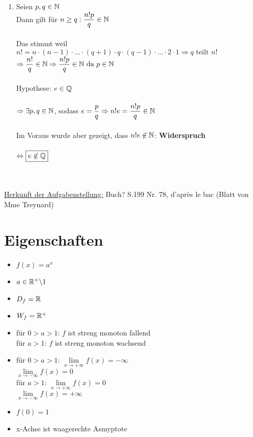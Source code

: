 \begin{Beweis}
\begin{enumerate}
\item Seien $p, q \in\mathbb{N}$\\
Dann gilt für $n\geq q:\dfrac{n!p}{q}\in\mathbb{N}$\\\\
Das stimmt weil $n!=n\cdot(n-1)\cdot...\cdot(q+1)\cdot q\cdot(q-1)\cdot...\cdot2\cdot1\Rightarrow q \text{ teilt }n!$
$\Rightarrow \dfrac{n!}{q}\in\mathbb{N}\Rightarrow\dfrac{n!p}{q}\in\mathbb{N}\text{ da }p\in\mathbb{N}$\\\\
Hypothese: $e\in\mathbb{Q}$\\\\
$\Rightarrow \exists p,q \in\mathbb{N}$, sodass $e=\dfrac{p}{q}\\
\Rightarrow n!e=\dfrac{n!p}{q}\in\mathbb{N}$\\\\
Im Voraus wurde aber gezeigt, dass $n!e\not\in\mathbb{N}$: \textbf{Widerspruch}\\\\
$\Leftrightarrow \boxed{e\not\in\mathbb{Q}}$ \heartsuit\\\\\\
\end{enumerate}
\underline{Herkunft der Aufgabenstellung:} Buch? S.199 Nr. 78, d'après le bac (Blatt von Mme Treynard)
\end{Beweis}

\section{Eigenschaften}
		

\begin{itemize}
\item$f(x)=a^x$
\item$a\in\mathbb{R}^+\backslash 1$
\item$D_f=\mathbb{R}$
\item$W_f=\mathbb{R}^+$
\item für $0>a>1$: $f$ ist streng monoton fallend\\
für $a>1$: $f$ ist streng monoton wachsend
\item für $0>a>1$: $\lim\limits_{x\to +\infty}f(x)=-\infty$\\
			$\lim\limits_{x\to -\infty}f(x)=0$\\
für $a>1$: $\lim\limits_{x\to +\infty}f(x)=0$\\
	        $\lim\limits_{x\to -\infty}f(x)=+\infty$
\item $f(0)=1$
\item x-Achse ist waagerechte Asmyptote

\end{itemize}

